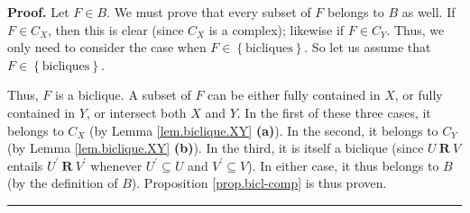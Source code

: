 \documentclass[numbers=enddot,12pt,final,onecolumn,notitlepage]{scrartcl}%
\theoremstyle{definition}
\newenvironment{proof}[1][Proof]{\noindent\textbf{#1.} }{\ \rule{0.5em}{0.5em}}
\newenvironment{vershort}{}{}
\begin{document}
\begin{vershort}


\begin{proof}
Let $F\in B$. We must prove that every subset of $F$ belongs to $B$ as well.
If $F\in C_{X}$, then this is clear (since $C_{X}$ is a complex); likewise if
$F\in C_{Y}$. Thus, we only need to consider the case when $F\in\left\{
\text{bicliques}\right\}  $. So let us assume that $F\in\left\{
\text{bicliques}\right\}  $.

Thus, $F$ is a biclique. A subset of $F$ can be either fully contained in $X$,
or fully contained in $Y$, or intersect both $X$ and $Y$. In the first of
these three cases, it belongs to $C_{X}$ (by Lemma \ref{lem.biclique.XY}
\textbf{(a)}). In the second, it belongs to $C_{Y}$ (by Lemma
\ref{lem.biclique.XY} \textbf{(b)}). In the third, it is itself a biclique
(since $U\ \mathbf{R}\ V$ entails $U^{\prime}\ \mathbf{R}\ V^{\prime}$
whenever $U^{\prime}\subseteq U$ and $V^{\prime}\subseteq V$). In either case,
it thus belongs to $B$ (by the definition of $B$). Proposition
\ref{prop.bicl-comp} is thus proven.
\end{proof}
\end{vershort}
\end{document}
